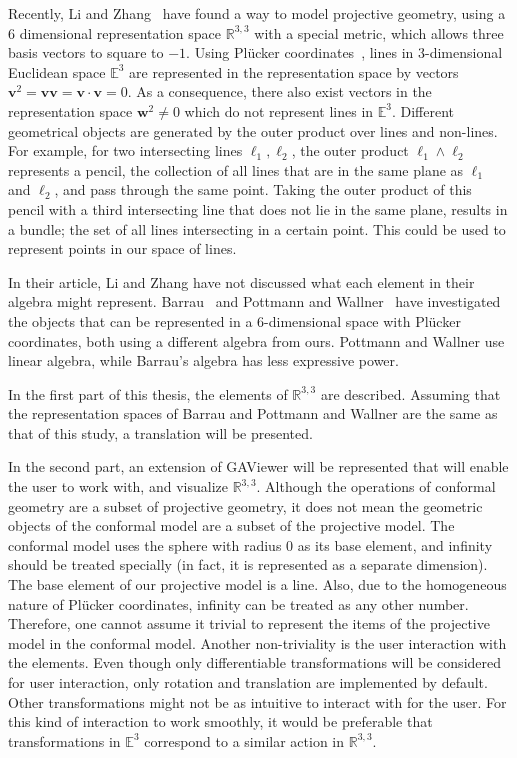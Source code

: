 \documentclass[a4paper,11pt,twoside]{article}
\newcommand{\V}[1]{\ensuremath{\mathbf{#1}}}
\newcommand{\reals}{\ensuremath{\mathbb{R}}}
\newcommand{\RL}{\ensuremath{\reals^{3,3}}}
\begin{document}
Recently, Li and Zhang~\cite{Hongbo} have found a way to model projective geometry, using a 6 dimensional representation space $\RL$ with a special metric, which allows three basis vectors to square to $-1$.  Using Pl\"ucker coordinates~\cite{Hongbo,Pottmann2}, lines in 3-dimensional Euclidean space $\mathbb{E}^3$ are represented in the representation space by vectors $\V{v}^2 = \V{v} \V{v} = \V{v} \cdot \V{v} = 0$.  As a consequence, there also exist vectors in the representation space $\V{w}^2 \not= 0$ which do not represent lines in $\mathbb{E}^3$.  Different geometrical objects are generated by the outer product over lines and non-lines.  For example, for two intersecting lines $\ell_1, \ell_2$, the outer product $\ell_1 \wedge \ell_2$ represents a pencil, the collection of all lines that are in the same plane as $\ell_1$ and $\ell_2$, and pass through the same point.  Taking the outer product of this pencil with a third intersecting line that does not lie in the same plane, results in a bundle; the set of all lines intersecting in a certain point.  This could be used to represent points in our space of lines.

In their article, Li and Zhang have not discussed what each element in their algebra might represent.  Barrau~\cite{Barrau1,Barrau2} and Pottmann and Wallner~\cite{Pottmann2,Pottmann3} have investigated the objects that can be represented in a 6-dimensional space with Pl\"ucker coordinates, both using a different algebra from ours.  Pottmann and Wallner use linear algebra, while Barrau's algebra has less expressive power.  

In the first part of this thesis, the elements of $\RL$ are described.  Assuming that the representation spaces of Barrau and Pottmann and Wallner are the same as that of this study, a translation will be presented.

In the second part, an extension of GAViewer will be represented that will enable the user to work with, and visualize $\RL$.  Although the operations of conformal geometry are a subset of projective geometry, it does not mean the geometric objects of the conformal model are a subset of the projective model.  The conformal model uses the sphere with radius $0$ as its base element, and infinity should be treated specially (in fact, it is represented as a separate dimension).  The base element of our projective model is a line.  Also, due to the homogeneous nature of Pl\"ucker coordinates, infinity can be treated as any other number.  Therefore, one cannot assume it trivial to represent the items of the projective model in the conformal model.  Another non-triviality is the user interaction with the elements.  Even though only differentiable transformations will be considered for user interaction, only rotation and translation are implemented by default.  Other transformations might not be as intuitive to interact with for the user.  For this kind of interaction to work smoothly, it would be preferable that transformations in $\mathbb{E}^3$ correspond to a similar action in $\RL$.
\end{document}
